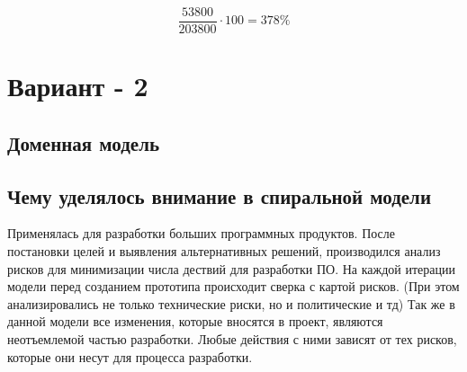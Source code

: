 \documentclass{article}
\begin{document}
\[\frac{53800}{203800} \cdot 100 = 378\%\]
\section[Рубеж]{Вариант - 2}
\subsection{Доменная модель}
\subsection{Чему уделялось внимание в спиральной модели}

Применялась для разработки больших программных продуктов. После постановки целей и выявления альтернативных решений, производился анализ рисков для минимизации числа дествий для разработки ПО. На каждой итерации модели перед созданием прототипа происходит сверка с картой рисков. (При этом анализировались не только технические риски, но и политические и тд)
Так же в данной модели все изменения, которые вносятся в проект, являются неотъемлемой частью разработки. Любые действия с ними зависят от тех рисков, которые они несут для процесса разработки.




\end{document}
